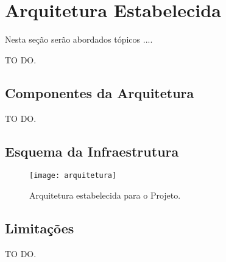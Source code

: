 \chapter{Arquitetura Estabelecida}
\label{chap:Arquitetura}
	
	Nesta seção serão abordados tópicos ....

	TO DO.

	\section{Componentes da Arquitetura}
	\label{sec:Arquitetura_Componentes}

		TO DO.

	\section{Esquema da Infraestrutura}
	\label{sec:Arquitetura_Esquema_Infra}

		\begin{figure}[h]
			\centering
			\texttt{[image: arquitetura]}
			\caption{Arquitetura estabelecida para o Projeto.}
			\label{fig:cronograma}
		\end{figure}

	\section{Limitações}
	\label{sec:Arquitetura_Limitacoes}

		TO DO.

		